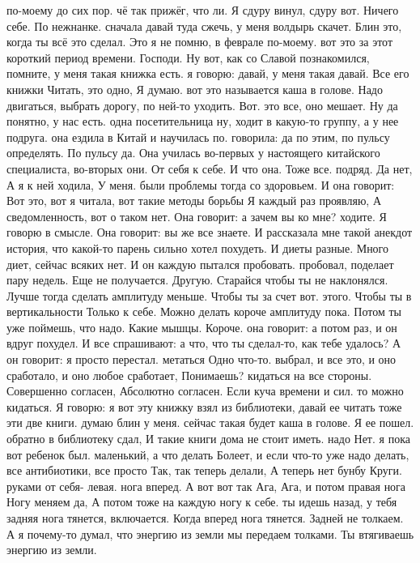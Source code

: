 по-моему до сих пор.
чё так прижёг, что ли.
Я сдуру винул, сдуру вот.
Ничего себе.
По нежнанке. сначала давай туда сжечь, у меня волдырь скачет.
Блин это, когда ты всё это сделал.
Это я не помню, в феврале по-моему.
вот это за этот короткий период времени.
Господи.
Ну вот, как со Славой познакомился, помните, у меня такая книжка есть. я говорю: давай, у меня такая давай.
Все его книжки Читать, это одно, Я думаю. вот это называется каша в голове. Надо двигаться, выбрать дорогу, по ней-то уходить. Вот.
это все, оно мешает. Ну да понятно, у нас есть.
одна посетительница ну, ходит в какую-то группу, а у нее подруга. она ездила в Китай и научилась по.
говорила: да по этим, по пульсу определять.
По пульсу да.
Она училась во-первых у настоящего китайского специалиста, во-вторых они.
От себя к себе.
И что она.
Тоже все.
подряд. Да нет, А я к ней ходила, У меня.
были проблемы тогда со здоровьем. И она говорит: Вот это, вот я читала, вот такие методы борьбы Я каждый раз проявляю, А сведомленность, вот о таком нет.
Она говорит: а зачем вы ко мне?
ходите.
Я говорю в смысле.
Она говорит: вы же все знаете.
И рассказала мне такой анекдот история, что какой-то парень сильно хотел похудеть.
И диеты разные.
Много диет, сейчас всяких нет.
И он каждую пытался пробовать. пробовал, поделает пару недель.
Еще не получается.
Другую.
Старайся чтобы ты не наклонялся.
Лучше тогда сделать амплитуду меньше.
Чтобы ты за счет вот.
этого.
Чтобы ты в вертикальности
Только к себе.
Можно делать короче амплитуду пока.
Потом ты уже поймешь, что надо.
Какие мышцы.
Короче. она говорит: а потом раз, и он вдруг похудел.
И все спрашивают: а что, что ты сделал-то, как тебе удалось?
А он говорит: я просто перестал.
метаться Одно что-то.
выбрал, и все это, и оно сработало, и оно любое сработает, Понимаешь?
кидаться на все стороны. Совершенно согласен, Абсолютно согласен.
Если куча времени и сил.
то можно кидаться. Я говорю: я вот эту книжку взял из библиотеки, давай ее читать тоже эти две книги. думаю блин у меня.
сейчас такая будет каша в голове. Я ее пошел.
обратно в библиотеку сдал, И такие книги дома не стоит иметь. надо Нет.
я пока вот ребенок был.
маленький, а что делать Болеет, и если что-то уже надо делать,
все антибиотики, все просто Так, так теперь делали, А теперь нет бунбу Круги.
руками от себя- левая.
нога вперед. А вот вот так Ага, Ага, и потом правая нога Ногу меняем да, А потом тоже на каждую ногу к себе.
ты идешь назад, у тебя задняя нога тянется, включается.
Когда вперед нога тянется.
Задней не толкаем.
А я почему-то думал, что энергию из земли мы передаем толками.
Ты втягиваешь энергию из земли.
